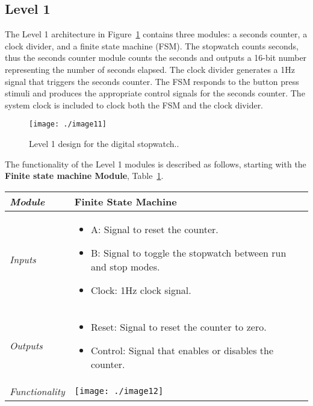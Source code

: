 \subsection*{Level 1}
\label{subsection:level-1-1}
The Level 1 architecture in Figure~\ref{figure:level1Stopwatch}
contains three modules: a seconds
counter, a clock divider, and a finite state machine (FSM). The
stopwatch counts seconds, thus the seconds counter module counts the
seconds and outputs a 16-bit number representing the number of seconds
elapsed. The clock divider generates a 1Hz signal that triggers the
seconds counter. The FSM responds to the button press stimuli and
produces the appropriate control signals for the seconds counter. The
system clock is included to clock both the FSM and the clock divider.

\begin{figure}[h]
\centering
\texttt{[image: ./image11]}
\caption{Level 1 design for the digital stopwatch..}
\label{figure:level1Stopwatch}
\end{figure}

The functionality of the Level 1 modules is described as follows,
starting with 
the \textbf{Finite state machine Module}, Table~\ref{table:level1FiniteStateMachine}.

\begin{table}[h]
\label{table:level1FiniteStateMachine}
\begin{tabular}{|l|m{10cm}|}
\hline
\emph{Module} & Finite State Machine \\ \hline
\emph{Inputs} & 
\begin{itemize}
\item
  A: Signal to reset the counter.
\item
  B: Signal to toggle the stopwatch between run and stop modes.
\item
  Clock: 1Hz clock signal.
\end{itemize}\\ \hline

\emph{Outputs} & 
\begin{itemize}
\item
  Reset: Signal to reset the counter to zero.
\item
  Control: Signal that enables or disables the counter.
\end{itemize} \\ \hline
\emph{Functionality} &
\texttt{[image: ./image12]} \\ \hline
\end{tabular}
\end{table}

